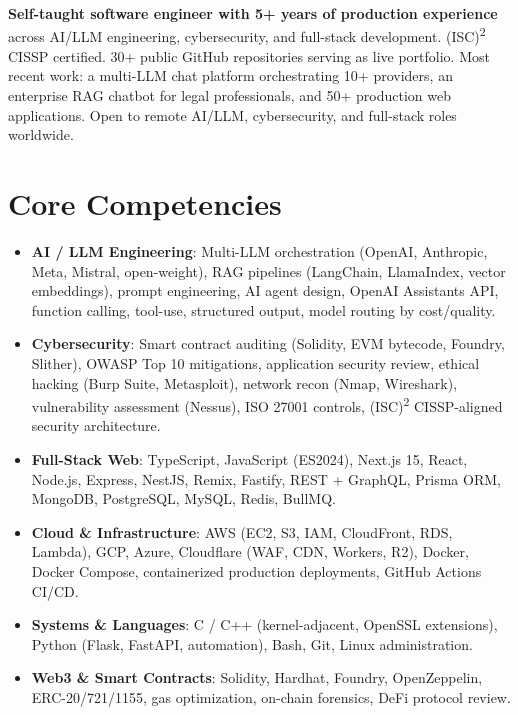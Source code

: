 \documentclass[11pt,a4paper,sans]{moderncv}
\begin{document}
\makecvtitle


\vspace{6pt}
\small{\textbf{Self-taught software engineer with 5+ years of production experience} across AI/LLM engineering, cybersecurity, and full-stack development. (ISC)\textsuperscript{2} CISSP certified. 30+ public GitHub repositories serving as live portfolio. Most recent work: a multi-LLM chat platform orchestrating 10+ providers, an enterprise RAG chatbot for legal professionals, and 50+ production web applications. Open to remote AI/LLM, cybersecurity, and full-stack roles worldwide.}


\section{Core Competencies}
\vspace{1pt}
\begin{itemize}

\item \textbf{AI / LLM Engineering}: Multi-LLM orchestration (OpenAI, Anthropic, Meta, Mistral, open-weight), RAG pipelines (LangChain, LlamaIndex, vector embeddings), prompt engineering, AI agent design, OpenAI Assistants API, function calling, tool-use, structured output, model routing by cost/quality.

\item \textbf{Cybersecurity}: Smart contract auditing (Solidity, EVM bytecode, Foundry, Slither), OWASP Top 10 mitigations, application security review, ethical hacking (Burp Suite, Metasploit), network recon (Nmap, Wireshark), vulnerability assessment (Nessus), ISO 27001 controls, (ISC)\textsuperscript{2} CISSP-aligned security architecture.

\item \textbf{Full-Stack Web}: TypeScript, JavaScript (ES2024), Next.js 15, React, Node.js, Express, NestJS, Remix, Fastify, REST + GraphQL, Prisma ORM, MongoDB, PostgreSQL, MySQL, Redis, BullMQ.

\item \textbf{Cloud \& Infrastructure}: AWS (EC2, S3, IAM, CloudFront, RDS, Lambda), GCP, Azure, Cloudflare (WAF, CDN, Workers, R2), Docker, Docker Compose, containerized production deployments, GitHub Actions CI/CD.

\item \textbf{Systems \& Languages}: C / C++ (kernel-adjacent, OpenSSL extensions), Python (Flask, FastAPI, automation), Bash, Git, Linux administration.

\item \textbf{Web3 \& Smart Contracts}: Solidity, Hardhat, Foundry, OpenZeppelin, ERC-20/721/1155, gas optimization, on-chain forensics, DeFi protocol review.

\end{itemize}
\end{document}
